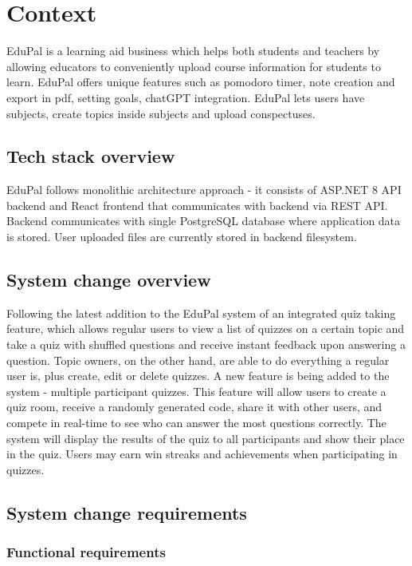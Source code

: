 \section{Context}

EduPal is a learning aid business which helps both students and teachers by allowing educators to conveniently upload course information for students to learn. EduPal offers unique features such as pomodoro timer, note creation and export in pdf, setting goals, chatGPT integration. EduPal lets users have subjects, create topics inside subjects and upload conspectuses.

\subsection{Tech stack overview}

EduPal follows monolithic architecture approach - it consists of ASP.NET 8 API backend and React frontend that communicates with backend via REST API. Backend communicates with single PostgreSQL database where application data is stored. User uploaded files are currently stored in backend filesystem.

\subsection{System change overview}

Following the latest addition to the EduPal system of an integrated quiz taking feature, which allows regular users to view a list of quizzes on a certain topic and take a quiz with shuffled questions and receive instant feedback upon answering a question. Topic owners, on the other hand, are able to do everything a regular user is, plus create, edit or delete quizzes. A new feature is being added to the system - multiple participant quizzes. This feature will allow users to create a quiz room, receive a randomly generated code, share it with other users, and compete in real-time to see who can answer the most questions correctly. The system will display the results of the quiz to all participants and show their place in the quiz. Users may earn win streaks and achievements when participating in quizzes.

\subsection{System change requirements}

\subsubsection{Functional requirements}

